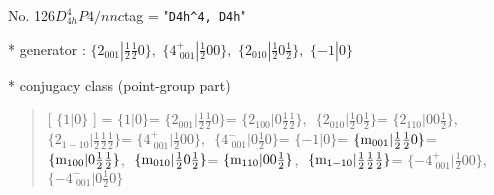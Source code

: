 \documentclass[fleqn,10pt,landscape]{jsarticle}
\begin{document}
\newpage

No. 126\quad$D_{4h}^{4}$\quad$P4/nnc$\quad[ tetragonal ]
tag = "{\tt D4h^4, D4h}"

* generator : $\{2{}_{001}|\frac{1}{2} \frac{1}{2} 0\},\,\,\{4^{+}_{\,\,001}|\frac{1}{2} 0 0\},\,\,\{2{}_{010}|\frac{1}{2} 0 \frac{1}{2}\},\,\,\{-1|0\}$

* conjugacy class (point-group part)
\begin{quote}
[ $\{1|0\}$ ] = \quad $\{1|0\}$ = \quad $\{2{}_{001}|\frac{1}{2} \frac{1}{2} 0\}$ = \quad $\{2{}_{100}|0 \frac{1}{2} \frac{1}{2}\}$,\,\, $\{2{}_{010}|\frac{1}{2} 0 \frac{1}{2}\}$\newline[ $\{2{}_{110}|0 0 \frac{1}{2}\}$ ] = \quad $\{2{}_{110}|0 0 \frac{1}{2}\}$,\,\, $\{2{}_{1-10}|\frac{1}{2} \frac{1}{2} \frac{1}{2}\}$\newline[ $\{4^{+}_{\,\,001}|\frac{1}{2} 0 0\}$ ] = \quad $\{4^{+}_{\,\,001}|\frac{1}{2} 0 0\}$,\,\, $\{4^{-}_{\,\,001}|0 \frac{1}{2} 0\}$\newline[ $\{-1|0\}$ ] = \quad $\{-1|0\}$ = \quad $\{{\rm m}_{001}|\frac{1}{2} \frac{1}{2} 0\}$ = \quad $\{{\rm m}_{100}|0 \frac{1}{2} \frac{1}{2}\}$,\,\, $\{{\rm m}_{010}|\frac{1}{2} 0 \frac{1}{2}\}$\newline[ $\{{\rm m}_{110}|0 0 \frac{1}{2}\}$ ] = \quad $\{{\rm m}_{110}|0 0 \frac{1}{2}\}$,\,\, $\{{\rm m}_{1-10}|\frac{1}{2} \frac{1}{2} \frac{1}{2}\}$\newline[ $\{-4^{+}_{\,\,001}|\frac{1}{2} 0 0\}$ ] = \quad $\{-4^{+}_{\,\,001}|\frac{1}{2} 0 0\}$,\,\, $\{-4^{-}_{\,\,001}|0 \frac{1}{2} 0\}$\newline
\end{quote}
\end{document}
